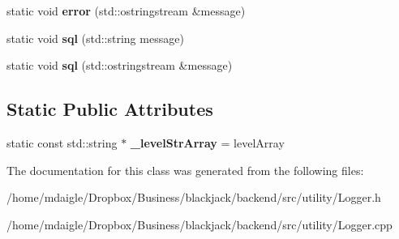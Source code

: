 \begin{DoxyCompactItemize}
\item 
\hypertarget{classLogger_a15c98cdd8700913c929ec6496dddc292}{
static void {\bfseries error} (std\-::ostringstream \&message)}
\label{db/d67/classLogger_a15c98cdd8700913c929ec6496dddc292}

\item 
\hypertarget{classLogger_a515be59fccbf995ddb55a4647e5410b1}{
static void {\bfseries sql} (std\-::string message)}
\label{db/d67/classLogger_a515be59fccbf995ddb55a4647e5410b1}

\item 
\hypertarget{classLogger_a6da936db51e93c11611026d01cc2e470}{
static void {\bfseries sql} (std\-::ostringstream \&message)}
\label{db/d67/classLogger_a6da936db51e93c11611026d01cc2e470}

\end{DoxyCompactItemize}
\subsection*{\-Static \-Public \-Attributes}
\begin{DoxyCompactItemize}
\item 
\hypertarget{classLogger_acaaf11fc84d3d7e5ef7f4eb45407084a}{
static const std\-::string $\ast$ {\bfseries \-\_\-level\-Str\-Array} = level\-Array}
\label{db/d67/classLogger_acaaf11fc84d3d7e5ef7f4eb45407084a}

\end{DoxyCompactItemize}


\-The documentation for this class was generated from the following files\-:\begin{DoxyCompactItemize}
\item 
/home/mdaigle/\-Dropbox/\-Business/blackjack/backend/src/utility/\-Logger.\-h\item 
/home/mdaigle/\-Dropbox/\-Business/blackjack/backend/src/utility/\-Logger.\-cpp\end{DoxyCompactItemize}
